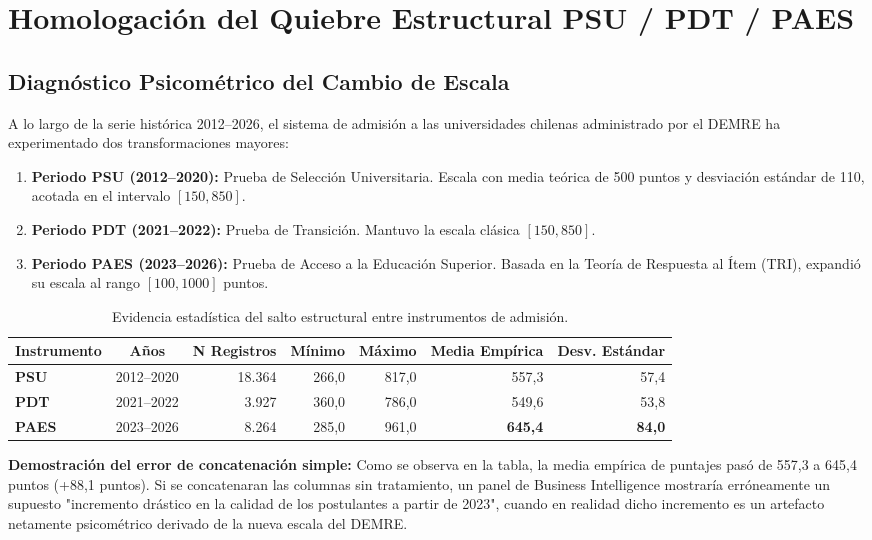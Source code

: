 \documentclass[11pt,a4paper]{article}
\begin{document}
\section{Homologación del Quiebre Estructural PSU / PDT / PAES}

\subsection{Diagnóstico Psicométrico del Cambio de Escala}
A lo largo de la serie histórica 2012--2026, el sistema de admisión a las universidades chilenas administrado por el DEMRE ha experimentado dos transformaciones mayores:
\begin{enumerate}
    \item \textbf{Periodo PSU (2012--2020):} Prueba de Selección Universitaria. Escala con media teórica de 500 puntos y desviación estándar de 110, acotada en el intervalo $[150, 850]$.
    \item \textbf{Periodo PDT (2021--2022):} Prueba de Transición. Mantuvo la escala clásica $[150, 850]$.
    \item \textbf{Periodo PAES (2023--2026):} Prueba de Acceso a la Educación Superior. Basada en la Teoría de Respuesta al Ítem (TRI), expandió su escala al rango $[100, 1000]$ puntos.
\end{enumerate}

\begin{table}[h!]
\centering
\small
\begin{tabular}{|l|c|r|r|r|r|r|}
\hline
\textbf{Instrumento} & \textbf{Años} & \textbf{N Registros} & \textbf{Mínimo} & \textbf{Máximo} & \textbf{Media Empírica} & \textbf{Desv. Estándar} \\
\hline
\textbf{PSU} & 2012--2020 & 18.364 & 266,0 & 817,0 & 557,3 & 57,4 \\
\textbf{PDT} & 2021--2022 & 3.927 & 360,0 & 786,0 & 549,6 & 53,8 \\
\textbf{PAES} & 2023--2026 & 8.264 & 285,0 & 961,0 & \textbf{645,4} & \textbf{84,0} \\
\hline
\end{tabular}
\caption{Evidencia estadística del salto estructural entre instrumentos de admisión.}
\end{table}

\textbf{Demostración del error de concatenación simple:} Como se observa en la tabla, la media empírica de puntajes pasó de 557,3 a 645,4 puntos (+88,1 puntos). Si se concatenaran las columnas sin tratamiento, un panel de Business Intelligence mostraría erróneamente un supuesto "incremento drástico en la calidad de los postulantes a partir de 2023", cuando en realidad dicho incremento es un artefacto netamente psicométrico derivado de la nueva escala del DEMRE.
\end{document}
